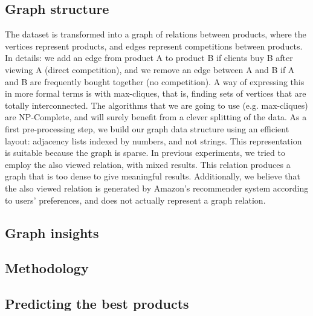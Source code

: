 \documentclass[11pt]{article}
\begin{document}
\subsection{Graph structure}
The dataset is transformed into a graph of relations between products, where the vertices represent products, and edges represent competitions between products. In details: we add an edge from product A to product B if clients buy B after viewing A (direct competition), and
we remove an edge between A and B if A and B are frequently bought together (no competition). A way of expressing this in more formal terms is with max-cliques, that is, finding sets of vertices that are totally interconnected.
The algorithms that we are going to use (e.g. max-cliques) are NP-Complete, and will surely benefit from a clever splitting of the data.
As a first pre-processing step, we build our graph data structure using an efficient layout: adjacency lists indexed by numbers, and not strings. This representation is suitable because the graph is sparse.
In previous experiments, we tried to employ the also viewed relation, with mixed results. This relation produces a graph that is too dense to give meaningful results. Additionally, we believe that the also viewed relation is generated by Amazon's recommender system according to users' preferences, and does not actually represent a graph relation.

\subsection{Graph insights}

\subsection{Methodology}

\subsection{Predicting the best products}
\end{document}
